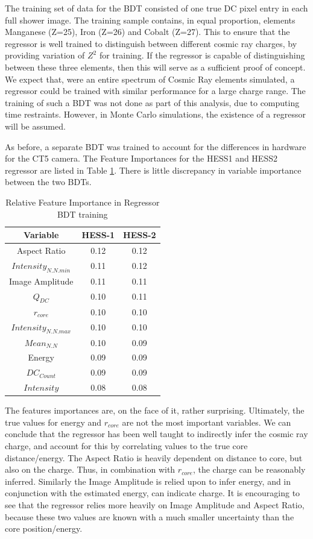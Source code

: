 \documentclass[11pt]{article}
\begin{document}
The training set of data for the BDT consisted of one true DC pixel entry in each full shower image. The training sample contains, in equal proportion, elements Manganese (Z=25), Iron (Z=26) and Cobalt (Z=27). This to ensure that the regressor is well trained to distinguish between different cosmic ray charges, by providing variation of $Z^{2}$ for training. If the regressor is capable of distinguishing between these three elements, then this will serve as a sufficient proof of concept. We expect that, were an entire spectrum of Cosmic Ray elements simulated, a regressor could be trained with similar performance for a large charge range. The training of such a BDT was not done as part of this analysis, due to computing time restraints. However, in Monte Carlo simulations, the existence of a regressor will be assumed.

As before, a separate BDT was trained to account for the differences in hardware for the CT5 camera. The Feature Importances for the HESS1 and HESS2 regressor are listed in Table \ref{tab:regressor}. There is little discrepancy in variable importance between the two BDTs.

\begin{table}[h!]
  \centering
  \caption{Relative Feature Importance in  Regressor BDT training}
  \label{tab:regressor}
  \begin{tabular}{ccc}
    \toprule
    Variable & HESS-1 & HESS-2 \\
    \midrule
    Aspect Ratio & 0.12 & 0.12\\
    $Intensity_{N.N.min}$ & 0.11 & 0.12\\
    Image Amplitude & 0.11 & 0.11\\
    $Q_{DC}$ & 0.10 & 0.11\\
    $r_{core}$ & 0.10 & 0.10\\
    $Intensity_{N.N.max}$ & 0.10 & 0.10\\
    $Mean_{N.N}$ & 0.10 & 0.09\\
    Energy & 0.09 & 0.09\\
    $DC_{Count}$ & 0.09 & 0.09\\
    $Intensity$ & 0.08 & 0.08\\
    \bottomrule
  \end{tabular}
\end{table}

The features importances are, on the face of it, rather surprising. Ultimately, the true values for energy and $r_{core}$ are not the most important variables. We can conclude that the regressor has been well taught to indirectly infer the cosmic ray charge, and account for this by correlating values to the true core distance/energy. The Aspect Ratio is heavily dependent on distance to core, but also on the charge. Thus, in combination with $r_{core}$, the charge can be reasonably inferred. Similarly the Image Amplitude is relied upon to infer energy, and in conjunction with the estimated energy, can indicate charge. It is encouraging to see that the regressor relies more heavily on Image Amplitude and Aspect Ratio, because these two values are known with a much smaller uncertainty than the core position/energy.
\end{document}
